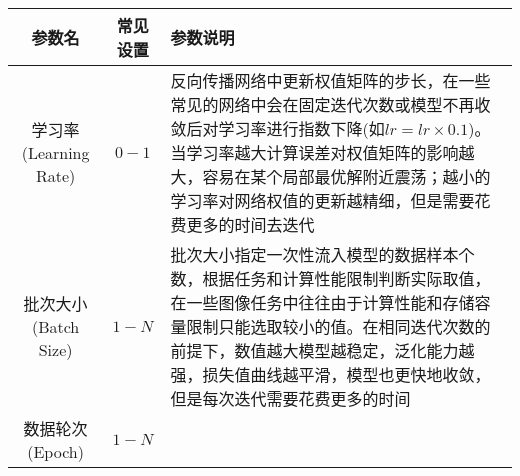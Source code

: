 \begin{longtable}[]{ ccl }
\toprule
\begin{minipage}[b]{0.09\columnwidth}\centering\strut
参数名\strut
\end{minipage} & \begin{minipage}[b]{0.10\columnwidth}\centering\strut
常见设置\strut
\end{minipage} & \begin{minipage}[b]{0.08\columnwidth}\raggedright\strut
参数说明\strut
\end{minipage}\tabularnewline
\midrule
\endhead
\begin{minipage}[t]{0.09\columnwidth}\centering\strut
学习率(Learning Rate)\strut
\end{minipage} & \begin{minipage}[t]{0.10\columnwidth}\centering\strut
\(0-1\)\strut
\end{minipage} & \begin{minipage}[t]{0.08\columnwidth}\raggedright\strut
反向传播网络中更新权值矩阵的步长，在一些常见的网络中会在固定迭代次数或模型不再收敛后对学习率进行指数下降(如\(lr=lr\times 0.1\))。当学习率越大计算误差对权值矩阵的影响越大，容易在某个局部最优解附近震荡；越小的学习率对网络权值的更新越精细，但是需要花费更多的时间去迭代\strut
\end{minipage}\tabularnewline
\begin{minipage}[t]{0.09\columnwidth}\centering\strut
批次大小(Batch Size)\strut
\end{minipage} & \begin{minipage}[t]{0.10\columnwidth}\centering\strut
\(1-N\)\strut
\end{minipage} & \begin{minipage}[t]{0.08\columnwidth}\raggedright\strut
批次大小指定一次性流入模型的数据样本个数，根据任务和计算性能限制判断实际取值，在一些图像任务中往往由于计算性能和存储容量限制只能选取较小的值。在相同迭代次数的前提下，数值越大模型越稳定，泛化能力越强，损失值曲线越平滑，模型也更快地收敛，但是每次迭代需要花费更多的时间\strut
\end{minipage}\tabularnewline
\begin{minipage}[t]{0.09\columnwidth}\centering\strut
数据轮次(Epoch)\strut
\end{minipage} & \begin{minipage}[t]{0.10\columnwidth}\centering\strut
\(1-N\)\strut
\end{minipage} & \begin{minipage}[t]{0.08\columnwidth}\raggedright\strut

\end{minipage}
\end{longtable}
